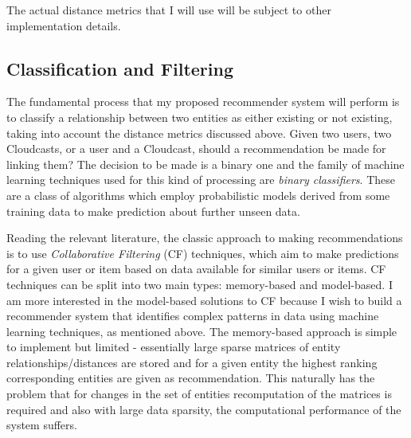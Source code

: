The actual distance metrics that I will use will be subject to other implementation details. 



\subsection*{Classification and Filtering}

The fundamental process that my proposed recommender system will perform is to classify a relationship between two entities as either existing or not existing, taking into account the distance metrics discussed above. Given two users, two Cloudcasts, or a user and a Cloudcast, should a recommendation be made for linking them? The decision to be made is a binary one and the family of machine learning techniques used for this kind of processing are \emph{binary classifiers}. These are a class of algorithms which employ probabilistic models derived from some training data to make prediction about further unseen data.

Reading the relevant literature, the classic approach to making recommendations is to use \emph{Collaborative Filtering} (CF) techniques, which aim to make predictions for a given user or item based on data available for similar users or items. CF techniques can be split into two main types: memory-based and model-based. I am more interested in the model-based solutions to CF because I wish to build a recommender system that identifies complex patterns in data using machine learning techniques, as mentioned above. The memory-based approach is simple to implement but limited - essentially large sparse matrices of entity relationships/distances are stored and for a given entity the highest ranking corresponding entities are given as recommendation. This naturally has the problem that for changes in the set of entities recomputation of the matrices is required and also with large data sparsity, the computational performance of the system suffers.


